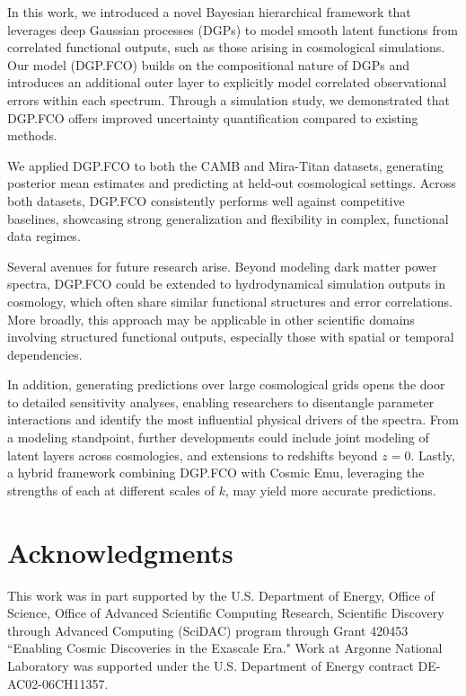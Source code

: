 \documentclass[11pt]{article}
\begin{document}
In this work, we introduced a novel Bayesian hierarchical framework that leverages deep 
Gaussian processes (DGPs) to model smooth latent functions from correlated functional outputs, 
such as those arising in cosmological simulations. Our model (DGP.FCO) builds on the 
compositional nature of DGPs and introduces an additional outer layer to explicitly 
model correlated observational errors within each spectrum. Through a simulation study, 
we demonstrated that DGP.FCO offers improved uncertainty 
quantification compared to existing methods.

We applied DGP.FCO to both the CAMB and Mira-Titan datasets, generating posterior mean estimates 
and predicting at held-out cosmological settings. Across both datasets, DGP.FCO 
consistently performs well against competitive baselines, showcasing strong generalization and 
flexibility in complex, functional data regimes.

Several avenues for future research arise. Beyond modeling dark matter power 
spectra, DGP.FCO could be extended to hydrodynamical simulation outputs in cosmology, which 
often share similar functional structures and error correlations. More broadly, this approach may be 
applicable in other scientific domains involving structured functional outputs, especially those 
with spatial or temporal dependencies.

In addition, generating predictions over large cosmological grids opens the door to detailed 
sensitivity analyses, enabling researchers to disentangle parameter interactions and identify 
the most influential physical drivers of the spectra. From a modeling standpoint, further 
developments could include joint modeling of latent layers across cosmologies, and extensions 
to redshifts beyond $z=0$. Lastly, a hybrid framework combining DGP.FCO with Cosmic Emu, leveraging 
the strengths of each at different scales of $k$, may yield more accurate predictions.

\section{Acknowledgments}
\label{sec:ack}

This work was in part supported by the U.S. Department
of Energy, Office of Science, Office of Advanced Scientific Computing Research, 
Scientific Discovery through Advanced Computing (SciDAC) program through 
Grant 420453 ``Enabling Cosmic Discoveries in the Exascale Era." Work at Argonne 
National Laboratory was supported under the U.S. Department of Energy 
contract DE-AC02-06CH11357.
\end{document}
